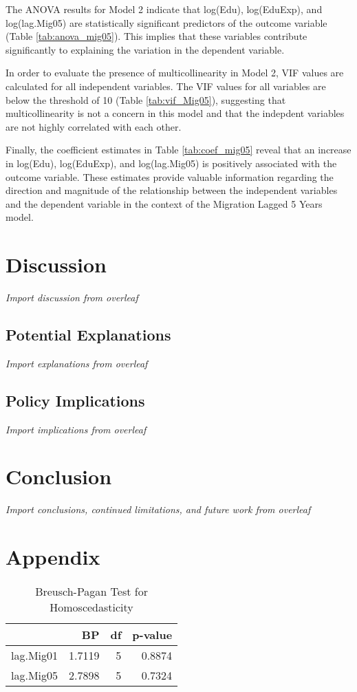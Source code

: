 \documentclass[12pt]{article}
\newcommand{\pointer}[1]{{\color{red} \center \textit{#1}}}
\begin{document}
The ANOVA results for Model 2 indicate that log(Edu), log(EduExp), and log(lag.Mig05) are statistically significant predictors of the outcome variable (Table \ref{tab:anova_mig05}).
This implies that these variables contribute significantly to explaining the variation in the dependent variable.

In order to evaluate the presence of multicollinearity in Model 2, VIF values are calculated for all independent variables.
The VIF values for all variables are below the threshold of 10 (Table \ref{tab:vif_Mig05}), suggesting that multicollinearity is not a concern in this model and that the indepdent variables are not highly correlated with each other.

Finally, the coefficient estimates in Table \ref{tab:coef_mig05} reveal that an increase in log(Edu), log(EduExp), and log(lag.Mig05) is positively associated with the outcome variable.
These estimates provide valuable information regarding the direction and magnitude of the relationship between the independent variables and the dependent variable in the context of the Migration Lagged 5 Years model.



\section{Discussion} \label{discussion}
\pointer{Import discussion from overleaf}
\subsection{Potential Explanations}
\pointer{Import explanations from overleaf}
\subsection{Policy Implications}
\pointer{Import implications from overleaf}
\section{Conclusion} \label{conclusion}
\pointer{Import conclusions, continued limitations, and future work  from overleaf}
\section{Appendix} \label{appendix}
\begin{table}[H]
    \centering
    \begin{tabular}{lrrr}
        \hline
                  & BP     & df & p-value \\
        \hline
        lag.Mig01 & 1.7119 & 5  & 0.8874  \\
        lag.Mig05 & 2.7898 & 5  & 0.7324  \\
        \hline
    \end{tabular}
    \caption{Breusch-Pagan Test for Homoscedasticity}
    \label{tab:bptest}
\end{table}
\end{document}
